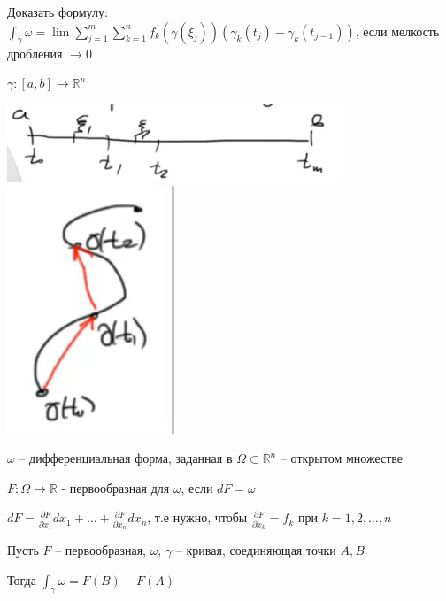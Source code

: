 \newpage

\begin{exerc}
    Доказать формулу: $\int_{\gamma}^{}\omega = \lim \sum_{j = 1}^{m} \sum_{k = 1}^{n} f_k (\gamma(\xi_j))(\gamma_k(t_j) - \gamma_k(t_{j - 1}))$, если мелкость дробления $\to 0$

    $\gamma: [a, b] \to \mathbb{R}^n$
    
    \begin{center}
        \includegraphics[width=10cm]{assets/03-intergrals-with-params/exercise-for-line-and-int-0.png}
        \includegraphics[width=5cm]{assets/03-intergrals-with-params/exercise-for-line-and-int-1.png}
    \end{center}
\end{exerc}

\begin{definition}
    $\omega$ -- дифференциальная форма, заданная в $\Omega \subset \mathbb{R}^n$ -- открытом множестве

    $F: \Omega \to \mathbb{R}$ - первообразная для $\omega$, если $dF = \omega$

    $dF = \frac{\partial F}{\partial x_1}dx_1 + \dots + \frac{\partial F}{\partial x_n}dx_n$, т.е нужно, чтобы $\frac{\partial F}{\partial x_k} = f_k$ при $k = 1, 2, \dots, n$
\end{definition}

\begin{theorem}
    Пусть $F$ -- первообразная, $\omega$, $\gamma$ -- кривая, соединяющая точки $A, B$

    Тогда $\int_{\gamma}^{}\omega = F(B) - F(A)$
\end{theorem}

